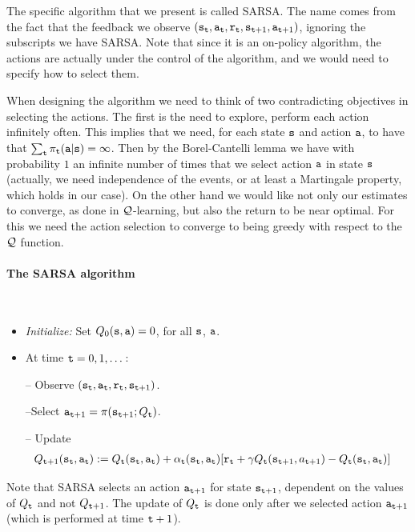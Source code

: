 The specific algorithm that we present is called SARSA. The name
comes from the fact that the feedback we observe
$({\tt s}_{\tt t},{\tt a}_{\tt t},{\tt r}_{\tt t},{\tt s}_{{\tt t}+1},{\tt a}_{{\tt t}+1})$,
ignoring the subscripts we have SARSA. Note that since it is an
on-policy algorithm, the actions are actually under the control of
the algorithm, and we would need to specify how to select them.

When designing the algorithm we need to think of two contradicting
objectives in selecting the actions. The first is the need to
explore, perform each action infinitely often. This implies that we
need, for each state ${\tt s}$ and action ${\tt a}$, to have that $\sum_{\tt t}
\pi_{\tt t}({\tt a}|{\tt s})=\infty$. Then by the Borel-Cantelli
lemma we have with probability $1$ an infinite number of times that
we select action ${\tt a}$ in state ${\tt s}$ (actually, we need
independence of the events, or at least a Martingale property, which
holds in our case). On the other hand we would like not only our
estimates to converge, as done in $\mathcal{Q}$-learning, but also the return
to be near optimal. For this we need the action selection to
converge to being greedy with respect to the $\mathcal{Q}$ function.

\paragraph{The SARSA algorithm}\ \\


\begin{itemize}
\item {\em Initialize:} Set $ Q_0({\tt s},{\tt a})=0$, for all ${\tt s}$, ${\tt a}$.

\item At time ${\tt t}=0,1,\dots$:

-- Observe
$({\tt s}_{\tt t},{\tt a}_{\tt t},{\tt r}_{\tt t},{\tt s}_{{\tt t}+1})$.

--Select ${\tt a}_{{\tt t}+1}=\pi({\tt s}_{{\tt t}+1};Q_{\tt t})$.

-- Update %
\begin{align*}
 Q_{{\tt t}+1}({\tt s}_{\tt t},{\tt a}_{\tt t}) & :=   Q_{\tt t} ({\tt s}_{\tt t},{\tt a}_{\tt t}) + \alpha_{\tt t}({\tt s}_{\tt t},{\tt a}_{\tt t})  [{\tt r}_{\tt t} +
\gamma  Q_{\tt t} ({\tt s}_{{\tt t}+1}, a_{{\tt t}+1}) -Q_{\tt t}
({\tt s}_{\tt t},{\tt a}_{\tt t})]
\end{align*}
\end{itemize}
Note that SARSA selects an action ${\tt a}_{{\tt t}+1}$ for state
${\tt s}_{{\tt t}+1}$, dependent on the values of $Q_{\tt t}$ and not
$Q_{{\tt t}+1}$. The update of $Q_{\tt t}$ is done only after we
selected action ${\tt a}_{{\tt t}+1}$ (which is performed at time
${\tt t}+1$).

